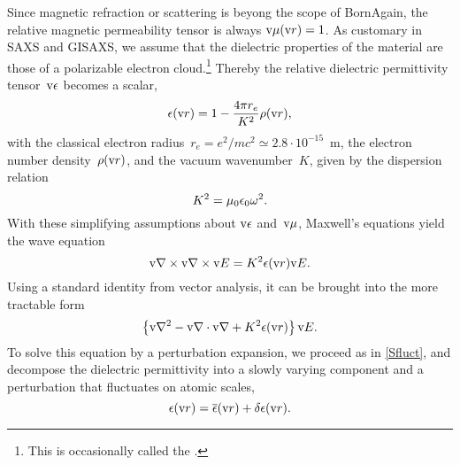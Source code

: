 Since magnetic refraction or scattering is beyong the scope of BornAgain,
the relative magnetic permeability tensor is always $\text{v}{\mu}(\text{v}{r})=1$.
%
%
As customary in SAXS and GISAXS,
%
%
we assume
that the dielectric properties of the material are those of a polarizable electron cloud.\footnote
{This is occasionally called the 
%
 \cite{Lau31}.}
Thereby the relative dielectric permittivity tensor~$\text{v}{\epsilon}$
%
%
becomes a scalar,
\begin{equation}
  \epsilon(\text{v}{r})=1-\frac{4\pi r_e}{K^2}\rho(\text{v}{r}),
\end{equation}
%
%
with the classical electron radius~$r_e=e^2/mc^2\simeq2.8\cdot10^{-15}$~m,
%
%
%
the electron number density~$\rho(\text{v}{r})$,
%
%
%
and the vacuum wavenumber~$K$,
given by the dispersion relation
\begin{equation}
  K^2 = \mu_0\epsilon_0\omega^2.
\end{equation}
%
With these simplifying assumptions about $\text{v}{\epsilon}$ and~$\text{v}{\mu}$,
Maxwell's equations yield the wave equation
\begin{equation}\label{ENabCrossNabE}
  \text{v}{\nabla}\times\text{v}{\nabla}\times\text{v}{E} = K^2\epsilon(\text{v}{r})\text{v}{E}.
\end{equation}
%
%
Using a standard identity from vector analysis, it can be brought into the more tractable form
\begin{equation}\label{ENabNabE}
  \left\{\text{v}{\nabla}^2-\text{v}{\nabla}\cdot\text{v}{\nabla}+ K^2\epsilon(\text{v}{r})\right\}\text{v}{E}.
\end{equation}
To solve this equation by a perturbation expansion,
%
we proceed as in \cref{Sfluct},
and decompose the dielectric permittivity
into a slowly varying component and a perturbation that fluctuates on atomic scales,
\begin{equation}
  \epsilon(\text{v}{r}) = \overline{\epsilon}(\text{v}{r}) + \delta\epsilon(\text{v}{r}).
\end{equation}
